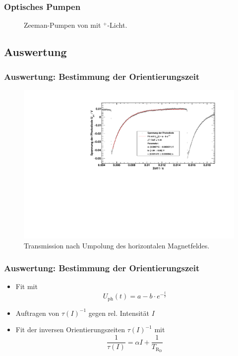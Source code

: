 \begin{frame}
\frametitle{Optisches Pumpen}
\begin{figure}
    \centering
    \def\svgwidth{\textwidth}
    
    \caption{Zeeman-Pumpen von  mit \textsigma$^+$-Licht.}
\end{figure}
\end{frame}

\subsection{Auswertung}
\begin{frame}
\frametitle{Auswertung: Bestimmung der Orientierungszeit}
\begin{figure}
    \begin{center}
        \includegraphics[width=\textwidth]{../img/65-5mA-10.pdf}
        \caption{Transmission nach Umpolung des horizontalen Magnetfeldes.}
    \end{center}
\end{figure}
\end{frame}

\begin{frame}
\frametitle{Auswertung: Bestimmung der Orientierungszeit}
\begin{itemize}[<+->]
    \item Fit mit
    \begin{equation*}
        U_{\text{ph}}(t)=a - b \cdot e^{-\frac{t}{\tau}}
    \end{equation*}
    \item Auftragen von $\tau(I)^{-1}$ gegen rel. Intensität $I$
    \item Fit der inversen Orientierungszeiten $\tau(I)^{-1}$ mit 
    \begin{equation*}
        \frac{1}{\tau(I)}=\alpha I + \frac{1}{T_{\text{R}_\text{D}}}
    \end{equation*}
\end{itemize}
\end{frame}

